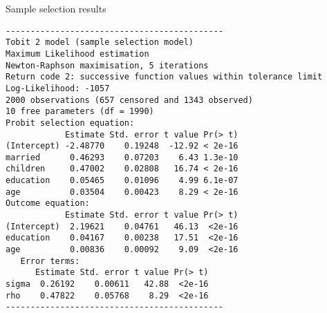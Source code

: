 \documentclass[10pt,ignorenonframetext,]{beamer}
\begin{document}
\begin{frame}[fragile]{Sample selection results}

\scriptsize

\begin{verbatim}
--------------------------------------------
Tobit 2 model (sample selection model)
Maximum Likelihood estimation
Newton-Raphson maximisation, 5 iterations
Return code 2: successive function values within tolerance limit
Log-Likelihood: -1057 
2000 observations (657 censored and 1343 observed)
10 free parameters (df = 1990)
Probit selection equation:
            Estimate Std. error t value Pr(> t)
(Intercept) -2.48770    0.19248  -12.92 < 2e-16
married      0.46293    0.07203    6.43 1.3e-10
children     0.47002    0.02808   16.74 < 2e-16
education    0.05465    0.01096    4.99 6.1e-07
age          0.03504    0.00423    8.29 < 2e-16
Outcome equation:
            Estimate Std. error t value Pr(> t)
(Intercept)  2.19621    0.04761   46.13  <2e-16
education    0.04167    0.00238   17.51  <2e-16
age          0.00836    0.00092    9.09  <2e-16
   Error terms:
      Estimate Std. error t value Pr(> t)
sigma  0.26192    0.00611   42.88  <2e-16
rho    0.47822    0.05768    8.29  <2e-16
--------------------------------------------
\end{verbatim}

\end{frame}
\end{document}
